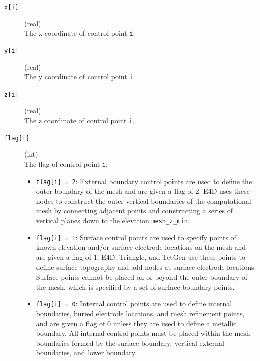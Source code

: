 \documentclass[a4paper,12pt]{article}
\begin{document}
\begin{description}
    \item[\texttt{x[i]}] (real)\hfill \\
    The x coordinate of control point \texttt{i}.

    \item[\texttt{y[i]}] (real)\hfill \\
    The y coordinate of control point \texttt{i}.

    \item[\texttt{z[i]}] (real)\hfill \\
    The z coordinate of control point \texttt{i}.

    \item[\texttt{flag[i]}] (int)\hfill \\
    The flag of control point \texttt{i}:
    \begin{itemize}
        \item \texttt{flag[i] = 2}: External boundary control points are used to define the outer boundary of the mesh and are given a flag of 2. E4D uses these nodes to construct the outer vertical boundaries of the computational mesh by connecting adjacent points and constructing a series of vertical planes down to the elevation \texttt{mesh\_z\_min}.
        \item \texttt{flag[i] = 1}: Surface control points are used to specify points of known elevation and/or surface electrode locations on the mesh and are given a flag of 1. E4D, Triangle, and TetGen use these points to define surface topography and add nodes at surface electrode locations. Surface points cannot be placed on or beyond the outer boundary of the mesh, which is specified by a set of surface boundary points.
        \item \texttt{flag[i] = 0}: Internal control points are used to define internal boundaries, buried electrode locations, and mesh refinement points, and are given a flag of 0 unless they are used to define a metallic boundary. All internal control points must be placed within the mesh boundaries formed by the surface boundary, vertical external boundaries, and lower boundary.
    \end{itemize}


\end{description}
\end{document}
